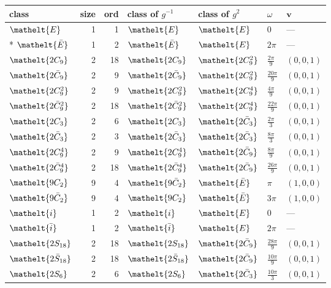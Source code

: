 \documentclass[10pt,a4paper]{article}
\numberwithin{equation}{section}
\newcommand{\eltfont}[1]{{\let\sigma\eltsigma\mathelt{#1}}}
\newcommand{\cls}[1]{\eltfont{#1}}
\newcommand{\dirvec}[3]{(#1, #2, #3)}
\newcommand{\vv}{\mathbf{v}}
\newcommand{\barred}[1]{\bar{#1}}
\begin{document}
{\renewcommand{\arraystretch}{1.3}\begin{longtable}{@{}lrrllll@{}}\toprule
class & size & ord & class of $g^{-1}$ & class of $g^{2}$ & $\omega$ & $\vv$\\\midrule\endhead
\bottomrule\endfoot\endlastfoot
$\cls{E}$ & 1 & 1 & $\cls{E}$ & $\cls{E}$ & $0$ & ---\\*
$\cls{\barred{E}}$ & 1 & 2 & $\cls{\barred{E}}$ & $\cls{E}$ & $2\pi$ & ---\\
$\cls{2C_{9}}$ & 2 & 18 & $\cls{2C_{9}}$ & $\cls{2C_{9}^{2}}$ & $\tfrac{2\pi}{9}$ & $\dirvec{0}{0}{1}$\\
$\cls{2\barred{C}_{9}}$ & 2 & 9 & $\cls{2\barred{C}_{9}}$ & $\cls{2C_{9}^{2}}$ & $\tfrac{20\pi}{9}$ & $\dirvec{0}{0}{1}$\\
$\cls{2C_{9}^{2}}$ & 2 & 9 & $\cls{2C_{9}^{2}}$ & $\cls{2C_{9}^{4}}$ & $\tfrac{4\pi}{9}$ & $\dirvec{0}{0}{1}$\\
$\cls{2\barred{C}_{9}^{2}}$ & 2 & 18 & $\cls{2\barred{C}_{9}^{2}}$ & $\cls{2C_{9}^{4}}$ & $\tfrac{22\pi}{9}$ & $\dirvec{0}{0}{1}$\\
$\cls{2C_{3}}$ & 2 & 6 & $\cls{2C_{3}}$ & $\cls{2\barred{C}_{3}}$ & $\tfrac{2\pi}{3}$ & $\dirvec{0}{0}{1}$\\
$\cls{2\barred{C}_{3}}$ & 2 & 3 & $\cls{2\barred{C}_{3}}$ & $\cls{2\barred{C}_{3}}$ & $\tfrac{8\pi}{3}$ & $\dirvec{0}{0}{1}$\\
$\cls{2C_{9}^{4}}$ & 2 & 9 & $\cls{2C_{9}^{4}}$ & $\cls{2\barred{C}_{9}}$ & $\tfrac{8\pi}{9}$ & $\dirvec{0}{0}{1}$\\
$\cls{2\barred{C}_{9}^{4}}$ & 2 & 18 & $\cls{2\barred{C}_{9}^{4}}$ & $\cls{2\barred{C}_{9}}$ & $\tfrac{26\pi}{9}$ & $\dirvec{0}{0}{1}$\\
$\cls{9C_{2}}$ & 9 & 4 & $\cls{9\barred{C}_{2}}$ & $\cls{\barred{E}}$ & $\pi$ & $\dirvec{1}{0}{0}$\\
$\cls{9\barred{C}_{2}}$ & 9 & 4 & $\cls{9C_{2}}$ & $\cls{\barred{E}}$ & $3\pi$ & $\dirvec{1}{0}{0}$\\
$\cls{i}$ & 1 & 2 & $\cls{i}$ & $\cls{E}$ & $0$ & ---\\
$\cls{\barred{i}}$ & 1 & 2 & $\cls{\barred{i}}$ & $\cls{E}$ & $2\pi$ & ---\\
$\cls{2S_{18}}$ & 2 & 18 & $\cls{2S_{18}}$ & $\cls{2\barred{C}_{9}}$ & $\tfrac{28\pi}{9}$ & $\dirvec{0}{0}{1}$\\
$\cls{2\barred{S}_{18}}$ & 2 & 18 & $\cls{2\barred{S}_{18}}$ & $\cls{2\barred{C}_{9}}$ & $\tfrac{10\pi}{9}$ & $\dirvec{0}{0}{1}$\\
$\cls{2S_{6}}$ & 2 & 6 & $\cls{2S_{6}}$ & $\cls{2\barred{C}_{3}}$ & $\tfrac{10\pi}{3}$ & $\dirvec{0}{0}{1}$\\

\end{longtable}}
\end{document}
